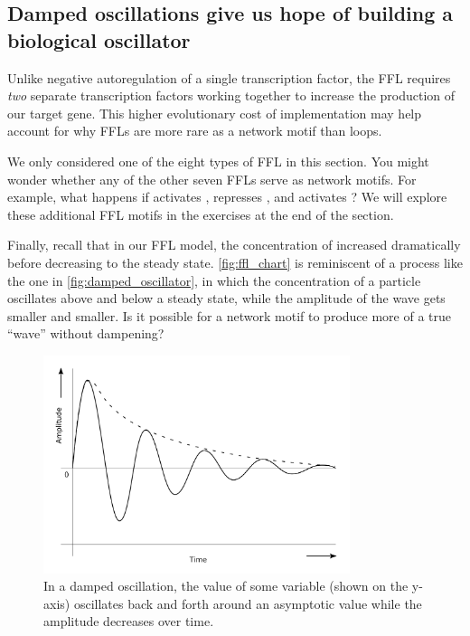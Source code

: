 \FloatBarrier
{}
\subsection{Damped oscillations give us hope of building a biological oscillator}

Unlike negative autoregulation of a single transcription factor, the FFL requires \textit{two} separate transcription factors working together to increase the production of our target gene. This higher evolutionary cost of implementation may help account for why FFLs are more rare as a network motif than loops.

We only considered one of the eight types of FFL in this section. You might wonder whether any of the other seven FFLs serve as network motifs.  For example, what happens if  activates ,  represses , and  activates ? We will explore these additional FFL motifs in the exercises at the end of the section.

Finally, recall that in our FFL model, the concentration of  increased dramatically before decreasing to the steady state. \autoref{fig:ffl_chart} is reminiscent of a  process like the one in \autoref{fig:damped_oscillator}, in which the concentration of a particle oscillates above and below a steady state, while the amplitude of the wave gets smaller and smaller. Is it possible for a network motif to produce more of a true ``wave'' without dampening?\\

\begin{figure}[h]
\centering
\mySfFamily
\includegraphics[width = 0.8\textwidth]{../images/damped_oscillator.png}
\caption{In a damped oscillation, the value of some variable (shown on the y-axis) oscillates back and forth around an asymptotic value while the amplitude decreases over time.}
\label{fig:damped_oscillator}
\end{figure}


